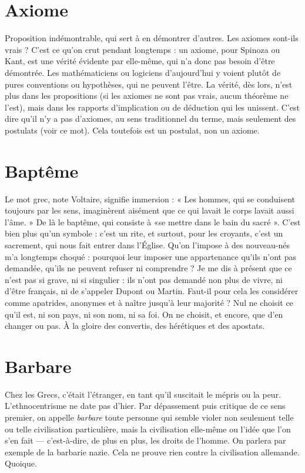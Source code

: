 \section{Axiome}
Proposition indémontrable, qui sert à en démontrer d’autres. Les
axiomes sont-ils vrais ? C’est ce qu’on crut pendant longtemps :
un axiome, pour Spinoza ou Kant, est une vérité évidente par elle-même, qui
n'a donc pas besoin d’être démontrée. Les mathématiciens ou logiciens
d’aujourd’hui y voient plutôt de pures conventions ou hypothèses, qui ne peuvent
l'être. La vérité, dès lors, n’est plus dans les propositions (si les axiomes ne
sont pas vrais, aucun théorème ne l’est), mais dans les rapports d’implication
ou de déduction qui les unissent. C’est dire qu’il n’y a pas d’axiomes, au sens
traditionnel du terme, mais seulement des postulats (voir ce mot). Cela toutefois
est un postulat, non un axiome.

\section{Baptême}
Le mot grec, note Voltaire, signifie immersion : « Les hommes,
qui se conduisent toujours par les sens, imaginèrent aisément que
ce qui lavait le corps lavait aussi l'âme. » De là le baptême, qui consiste à «se
mettre dans le bain du sacré ». C’est bien plus qu’un symbole : c’est un rite, et
surtout, pour les croyants, c’est un sacrement, qui nous fait entrer dans l’Église.
Qu'on l’impose à des nouveau-nés m’a longtemps choqué : pourquoi leur
imposer une appartenance qu’ils n’ont pas demandée, qu’ils ne peuvent refuser
ni comprendre ? Je me dis à présent que ce n’est pas si grave, ni si singulier : ils
n’ont pas demandé non plus de vivre, ni d’être français, ni de s'appeler Dupont
ou Martin. Faut-il pour cela les considérer comme apatrides, anonymes et à
naître jusqu’à leur majorité ? Nul ne choisit ce qu’il est, ni son pays, ni son
nom, ni sa foi. On ne choisit, et encore, que d’en changer ou pas. À la gloire
des convertis, des hérétiques et des apostats.

\section{Barbare}
Chez les Grecs, c'était l'étranger, en tant qu’il suscitait le mépris
ou la peur. L’ethnocentrisme ne date pas d’hier. Par dépassement
puis critique de ce sens premier, on appelle {\it barbare} toute personne qui semble
violer non seulement telle ou telle civilisation particulière, mais la civilisation
elle-même ou l’idée que l’on s’en fait — c’est-à-dire, de plus en plus, les droits
de l’homme. On parlera par exemple de la barbarie nazie. Cela ne prouve rien
contre la civilisation allemande. Quoique.

